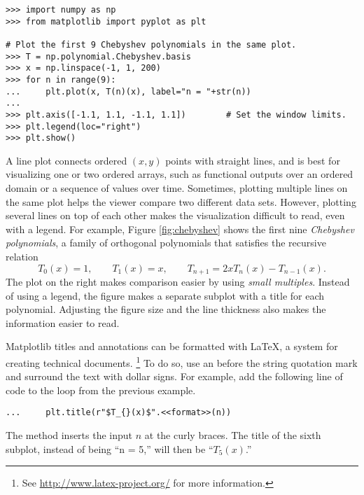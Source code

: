 \begin{lstlisting}
>>> import numpy as np
>>> from matplotlib import pyplot as plt

# Plot the first 9 Chebyshev polynomials in the same plot.
>>> T = np.polynomial.Chebyshev.basis
>>> x = np.linspace(-1, 1, 200)
>>> for n in range(9):
...     plt.plot(x, T(n)(x), label="n = "+str(n))
...
>>> plt.axis([-1.1, 1.1, -1.1, 1.1])        # Set the window limits.
>>> plt.legend(loc="right")
>>> plt.show()
\end{lstlisting}

A line plot connects ordered $(x,y)$ points with straight lines, and is best for visualizing one or two ordered arrays, such as functional outputs over an ordered domain or a sequence of values over time.
Sometimes, plotting multiple lines on the same plot helps the viewer compare two different data sets.
However, plotting several lines on top of each other makes the visualization difficult to read, even with a legend.
For example, Figure \ref{fig:chebyshev} shows the first nine \emph{Chebyshev polynomials}, a family of orthogonal polynomials that satisfies the recursive relation
\[
T_0(x) = 1, \qquad T_1(x) = x, \qquad T_{n+1} = 2xT_n(x) - T_{n-1}(x).
\]
The plot on the right makes comparison easier by using \emph{small multiples}. %
Instead of using a legend, the figure makes a separate subplot with a title for each polynomial.
Adjusting the figure size and the line thickness also makes the information easier to read.


\begin{info} %
Matplotlib titles and annotations can be formatted with \LaTeX, a system for creating technical documents.%
\footnote{See \url{http://www.latex-project.org/} for more information.}
To do so, use an  before the string quotation mark and surround the text with dollar signs.
For example, add the following line of code to the loop from the previous example.

\begin{lstlisting}
...     plt.title(r"$T_{}(x)$".<<format>>(n))
\end{lstlisting}

The  method inserts the input $n$ at the curly braces.
The title of the sixth subplot, instead of being ``n = 5,'' will then be ``$T_5(x)$.''
\end{info}

